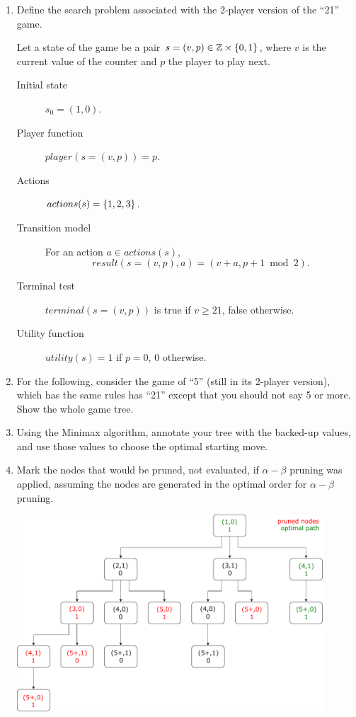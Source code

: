\documentclass[11pt, a4paper]{article}
\begin{document}
\begin{enumerate}
    \item Define the search problem associated with the 2-player version of the \enquote{21} game.
    
    \begin{solution}
        Let a state of the game be a pair $s = (v, p) \in \mathbb{Z} \times \{0, 1\}$, where $v$ is the current value of the counter and $p$ the player to play next.
        \begin{description}
            \item[Initial state] $s_0 = (1, 0)$.
            \item[Player function] $player(s = (v, p)) = p$.
            \item[Actions] $actions(s) = \{1, 2, 3\}$.
            \item[Transition model] For an action $a \in actions(s)$, $$result(s = (v, p), a) = (v + a,  p + 1 \bmod 2).$$
            \item[Terminal test] $terminal(s = (v, p))$ is true if $v \geq 21$, false otherwise.
            \item[Utility function] $utility(s) = 1$ if $p = 0$, $0$ otherwise.
        \end{description}
    \end{solution}
    
    \item For the following, consider the game of \enquote{5} (still in its 2-player version), which has the same rules has \enquote{21} except that you should not say 5 or more. Show the whole game tree.
    \item Using the Minimax algorithm, annotate your tree with the backed-up values, and use those values to choose the optimal starting move.
    \item Mark the nodes that would be pruned, \ie{} not evaluated, if $\alpha - \beta$ pruning was applied, assuming the nodes are generated in the optimal order for $\alpha - \beta$ pruning.
    
    \begin{solution}
        \begin{center}
            \includegraphics[width=0.9\textwidth]{figures/e2_21.pdf}
        \end{center}
    \end{solution}
\end{enumerate}
\end{document}
